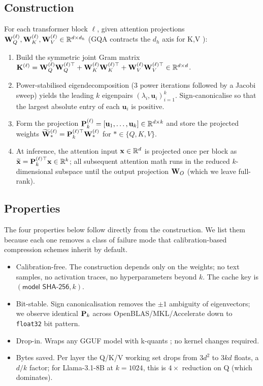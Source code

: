 \documentclass[11pt]{article}
\begin{document}
\subsection{Construction}
For each transformer block $\ell$, given attention projections
$\mathbf{W}_Q^{(\ell)},\mathbf{W}_K^{(\ell)},\mathbf{W}_V^{(\ell)}\in\mathbb{R}^{d\times d_h}$
(GQA contracts the $d_h$ axis for K,V \cite{ainslie2023gqa}):
\begin{enumerate}
\item Build the symmetric joint Gram matrix
$\mathbf{K}^{(\ell)} = \mathbf{W}_Q^{(\ell)}\mathbf{W}_Q^{(\ell)\top}+\mathbf{W}_K^{(\ell)}\mathbf{W}_K^{(\ell)\top}+\mathbf{W}_V^{(\ell)}\mathbf{W}_V^{(\ell)\top}\in\mathbb{R}^{d\times d}$.
\item Power-stabilised eigendecomposition (3 power iterations followed by a
Jacobi sweep) yields the leading $k$ eigenpairs
$(\lambda_i,\mathbf{u}_i)_{i=1}^k$.  Sign-canonicalise so that the largest
absolute entry of each $\mathbf{u}_i$ is positive.
\item Form the projection $\mathbf{P}_k^{(\ell)}=[\mathbf{u}_1,\dots,\mathbf{u}_k]
\in\mathbb{R}^{d\times k}$ and store the projected weights
$\widetilde{\mathbf{W}}_*^{(\ell)} = \mathbf{P}_k^{(\ell)\top}\mathbf{W}_*^{(\ell)}$ for
$*\in\{Q,K,V\}$.
\item At inference, the attention input $\mathbf{x}\in\mathbb{R}^d$ is projected once
per block as $\widetilde{\mathbf{x}} = \mathbf{P}_k^{(\ell)\top}\mathbf{x}\in\mathbb{R}^k$;
all subsequent attention math runs in the reduced $k$-dimensional subspace
until the output projection $\mathbf{W}_O$ (which we leave full-rank).
\end{enumerate}

\subsection{Properties}
The four properties below follow directly from the construction. We list
them because each one removes a class of failure mode that calibration-based
compression schemes inherit by default.

\begin{itemize}
\item Calibration-free. The construction depends only on the
weights; no text samples, no activation traces, no hyperparameters beyond
$k$.  The cache key is $(\textsf{model SHA-256}, k)$.
\item Bit-stable.  Sign canonicalisation removes the
$\pm1$ ambiguity of eigenvectors; we observe identical $\mathbf{P}_k$ across
OpenBLAS/MKL/Accelerate down to \texttt{float32} bit pattern.
\item Drop-in.  Wraps any GGUF \cite{ggerganov2023gguf} model with
k-quants \cite{ggerganov2023kquants}; no kernel changes required.
\item Bytes saved.  Per layer the Q/K/V working set drops from
$3d^2$ to $3kd$ floats, a $d/k$ factor; for Llama-3.1-8B at $k{=}1024$, this
is $4\times$ reduction on Q (which dominates).
\end{itemize}
\FloatBarrier
\end{document}

